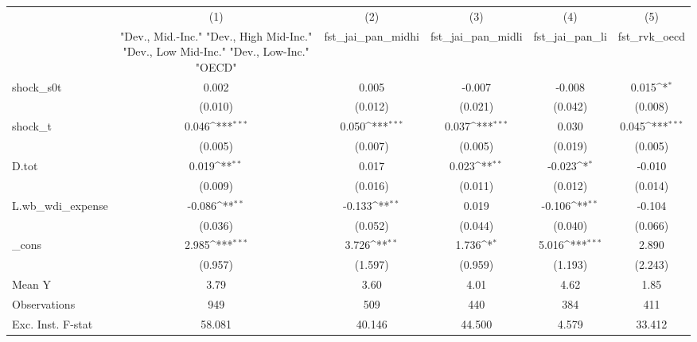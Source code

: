 {
\def\sym#1{\ifmmode^{#1}\else\(^{#1}\)\fi}
\begin{tabular}{l*{5}{c}}
\toprule
            &\multicolumn{1}{c}{(1)}&\multicolumn{1}{c}{(2)}&\multicolumn{1}{c}{(3)}&\multicolumn{1}{c}{(4)}&\multicolumn{1}{c}{(5)}\\
            &\multicolumn{1}{c}{ "Dev., Mid.-Inc." "Dev., High Mid-Inc." "Dev., Low Mid-Inc." "Dev., Low-Inc." "OECD" }&\multicolumn{1}{c}{fst\_jai\_pan\_midhi}&\multicolumn{1}{c}{fst\_jai\_pan\_midli}&\multicolumn{1}{c}{fst\_jai\_pan\_li}&\multicolumn{1}{c}{fst\_rvk\_oecd}\\
\midrule
shock\_s0t   &       0.002         &       0.005         &      -0.007         &      -0.008         &       0.015\sym{*}  \\
            &     (0.010)         &     (0.012)         &     (0.021)         &     (0.042)         &     (0.008)         \\
\addlinespace
shock\_t     &       0.046\sym{***}&       0.050\sym{***}&       0.037\sym{***}&       0.030         &       0.045\sym{***}\\
            &     (0.005)         &     (0.007)         &     (0.005)         &     (0.019)         &     (0.005)         \\
\addlinespace
D.tot       &       0.019\sym{**} &       0.017         &       0.023\sym{**} &      -0.023\sym{*}  &      -0.010         \\
            &     (0.009)         &     (0.016)         &     (0.011)         &     (0.012)         &     (0.014)         \\
\addlinespace
L.wb\_wdi\_expense&      -0.086\sym{**} &      -0.133\sym{**} &       0.019         &      -0.106\sym{**} &      -0.104         \\
            &     (0.036)         &     (0.052)         &     (0.044)         &     (0.040)         &     (0.066)         \\
\addlinespace
\_cons      &       2.985\sym{***}&       3.726\sym{**} &       1.736\sym{*}  &       5.016\sym{***}&       2.890         \\
            &     (0.957)         &     (1.597)         &     (0.959)         &     (1.193)         &     (2.243)         \\
\midrule
Mean Y      &        3.79         &        3.60         &        4.01         &        4.62         &        1.85         \\
Observations&         949         &         509         &         440         &         384         &         411         \\
Exc. Inst. F-stat&      58.081         &      40.146         &      44.500         &       4.579         &      33.412         \\
\bottomrule
\end{tabular}
}
